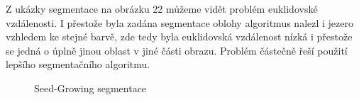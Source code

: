 \documentclass[czech, master, public, dept460, male, cpdeclaration, oneside]{diploma}
\begin{document}
\newpage
\noindent
Z ukázky segmentace na obrázku 22 můžeme vidět problém euklidovské vzdálenosti. I přestože byla zadána segmentace oblohy  algoritmus nalezl i jezero vzhledem ke stejné barvě, zde tedy byla euklidovská vzdálenost nízká i přestože se jedná o úplně jinou oblast v jiné části obrazu. Problém částečně řeší použití lepšího segmentačního algoritmu.
\begin{figure}[H]
	\centering	
		\qquad
	\caption{Seed-Growing segmentace}
\end{figure}
\end{document}
